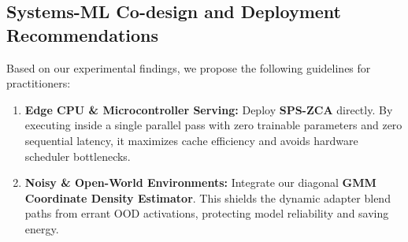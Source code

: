 \subsection{Systems-ML Co-design and Deployment Recommendations}
Based on our experimental findings, we propose the following guidelines for practitioners:
\begin{enumerate}
    \item \textbf{Edge CPU \& Microcontroller Serving:} Deploy \textbf{SPS-ZCA} directly. By executing inside a single parallel pass with zero trainable parameters and zero sequential latency, it maximizes cache efficiency and avoids hardware scheduler bottlenecks.
    \item \textbf{Noisy \& Open-World Environments:} Integrate our diagonal \textbf{GMM Coordinate Density Estimator}. This shields the dynamic adapter blend paths from errant OOD activations, protecting model reliability and saving energy.
\end{enumerate}
